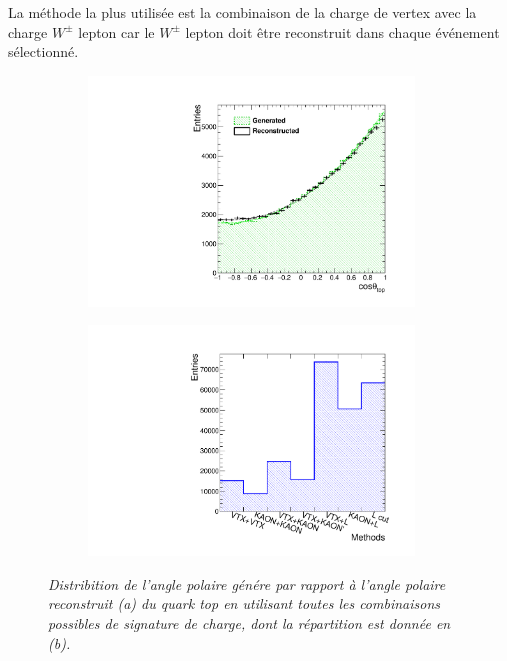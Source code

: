 La méthode la plus utilisée est la combinaison de la charge de vertex avec la charge $W^\pm$ lepton car le $ W^\pm$ lepton doit être reconstruit dans chaque événement sélectionné.

\begin{figure}
	\centering
	\begin{subfigure}{0.5\textwidth}
		\includegraphics[width=0.95\textwidth]{ILD/plots/top-asymmetry-lepton.pdf}
		\caption{\label{fig:TopAsymmetryChi_a_3F} }
	\end{subfigure}%
	\begin{subfigure}{0.5\textwidth}
		\centering
		\includegraphics[width=0.95\textwidth]{ILD/plots/top-methods-lepton.pdf}
		\caption{\label{fig:TopAsymmetryChi_b_3F} }
	\end{subfigure}
	\caption{\sl Distribition de l'angle polaire génére par rapport à l'angle polaire reconstruit (a) du quark top en utilisant toutes les combinaisons possibles de signature de charge, dont la répartition est donnée en (b).}
	\label{fig:TopAsymmetryChi_3F}
\end{figure}

